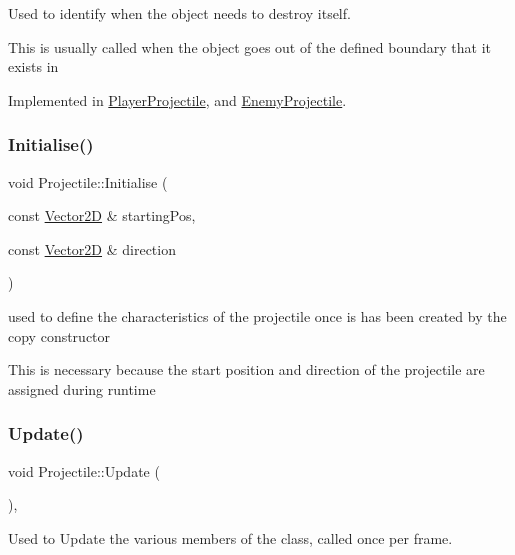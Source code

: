 Used to identify when the object needs to destroy itself. 

This is usually called when the object goes out of the defined boundary that it exists in 

Implemented in \hyperlink{class_player_projectile_a05a6c103f9fbae57bfc811e477ab7b5b}{Player\+Projectile}, and \hyperlink{class_enemy_projectile_a6ea9e3418fd05ca7ecee016019206f70}{Enemy\+Projectile}.

\mbox{\label{class_projectile_a8c1501698a272f3ae0def6bdc6b3d763}} 
\subsubsection{\texorpdfstring{Initialise()}{Initialise()}}
{\footnotesize\ttfamily void Projectile\+::\+Initialise (\begin{DoxyParamCaption}\item[{const \hyperlink{class_vector2_d}{Vector2D} \&}]{starting\+Pos,  }\item[{const \hyperlink{class_vector2_d}{Vector2D} \&}]{direction }\end{DoxyParamCaption})\hspace{0.3cm}{\ttfamily [virtual]}}



used to define the characteristics of the projectile once is has been created by the copy constructor 

This is necessary because the start position and direction of the projectile are assigned during runtime \mbox{\label{class_projectile_a1f9df5dd65fed410d4e897eb63edc1c9}} 
\subsubsection{\texorpdfstring{Update()}{Update()}}
{\footnotesize\ttfamily void Projectile\+::\+Update (\begin{DoxyParamCaption}{ }\end{DoxyParamCaption})\hspace{0.3cm}{\ttfamily [final]}, {\ttfamily [virtual]}}



Used to Update the various members of the class, called once per frame. 

